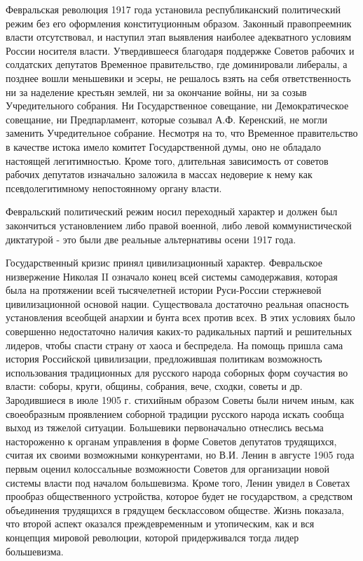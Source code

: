 \documentclass{article}
\begin{document}
Февральская революция 1917 года установила республиканский политический режим без его оформления конституционным образом. Законный правопреемник власти отсутствовал, и наступил этап выявления наиболее адекватного условиям России носителя власти. Утвердившееся благодаря поддержке Советов рабочих и солдатских депутатов Временное правительство, где доминировали либералы, а позднее вошли меньшевики и эсеры, не решалось взять на себя ответственность ни за наделение крестьян землей, ни за окончание войны, ни за созыв Учредительного собрания. Ни Государственное совещание, ни Демократическое совещание, ни Предпарламент, которые созывал А.Ф. Керенский, не могли заменить Учредительное собрание. Несмотря на то, что Временное правительство в качестве истока имело комитет Государственной думы, оно не обладало настоящей легитимностью. Кроме того, длительная зависимость от советов рабочих депутатов изначально заложила в массах недоверие к нему как псевдолегитимному непостоянному органу власти.

\hfill

Февральский политический режим носил переходный характер и должен был закончиться установлением либо правой военной, либо левой коммунистической диктатурой - это были две реальные альтернативы осени 1917 года.

\hfill

Государственный кризис принял цивилизационный характер. Февральское низвержение Николая II означало конец всей системы самодержавия, которая была на протяжении всей тысячелетней истории Руси-России стержневой цивилизационной основой нации. Существовала достаточно реальная опасность установления всеобщей анархии и бунта всех против всех. В этих условиях было совершенно недостаточно наличия каких-то радикальных партий и решительных лидеров, чтобы спасти страну от хаоса и беспредела. На помощь пришла сама история Российской цивилизации, предложившая политикам возможность использования традиционных для русского народа соборных форм соучастия во власти: соборы, круги, общины, собрания, вече, сходки, советы и др. Зародившиеся в июле 1905 г. стихийным образом Советы были ничем иным, как своеобразным проявлением соборной традиции русского народа искать сообща выход из тяжелой ситуации. Большевики первоначально отнеслись весьма настороженно к органам управления в форме Советов депутатов трудящихся, считая их своими возможными конкурентами, но В.И. Ленин в августе 1905 года первым оценил колоссальные возможности Советов для организации новой системы власти под началом большевизма. Кроме того, Ленин увидел в Советах прообраз общественного устройства, которое будет не государством, а средством объединения трудящихся в грядущем бесклассовом обществе. Жизнь показала, что второй аспект оказался преждевременным и утопическим, как и вся концепция мировой революции, которой придерживался тогда лидер большевизма.
\end{document}
